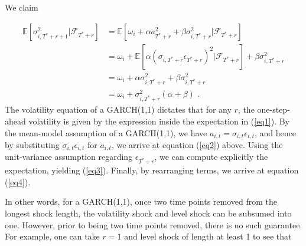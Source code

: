 \documentclass[11pt]{article}
\theoremstyle{definition}
\newenvironment{proof-of-proposition}[1][{}]{\noindent{\bf
    Proof of Proposition {#1}}
  \hspace*{.5em}}{\qed\bigskip\\}
\begin{document}
\begin{proof-of-proposition}
We claim

\begin{align}
\mathbb{E}[ \sigma^{2}_{i,T^{*}+r+1} |\mathcal{F}_{T^{*}+r}] & = \mathbb{E}[\omega_{i} + \alpha a_{T^{*}+r}^{2} + \beta\sigma^{2}_{i,T^{*}+r} |\mathcal{F}_{T^{*}+r}] \label{eq1}\\
& = \omega_{i} + \mathbb{E}[\alpha(\sigma_{i,T^{*}+r}\epsilon_{T^{*}+r})^{2} |\mathcal{F}_{T^{*}+r}] + \beta\sigma^{2}_{i,T^{*}+r} \label{eq2}\\
& = \omega_{i} + \alpha\sigma_{i,T^{*}+r}^{2} + \beta\sigma^{2}_{i,T^{*}+r} \label{eq3}\\
& = \omega_{i} + \sigma^{2}_{i,T^{*}+r}(\alpha + \beta) \label{eq4} \text{ .}
\end{align}
The volatility equation of a GARCH(1,1) dictates that for any $r$, the one-step-ahead volatility is given by the expression inside the expectation in (\ref{eq1}).  By the mean-model assumption of a GARCH(1,1), we have $a_{i,t} = \sigma_{i,t}\epsilon_{i,t}$, and hence by substituting $\sigma_{i,t}\epsilon_{i,t}$ for $a_{i,t}$, we arrive at equation (\ref{eq2}) above.  Using the unit-variance assumption regarding $\epsilon_{T^{*}+r}$, we can compute explicitly the expectation, yielding (\ref{eq3}).  Finally, by rearranging terms, we arrive at equation (\ref{eq4}).
\end{proof-of-proposition}
In other words, for a GARCH(1,1), once two time points removed from the longest shock length, the volatility shock and level shock can be subsumed into one.  However, prior to being two time points removed, there is no such guarantee.  For example, one can take $r = 1$ and level shock of length at least 1 to see that 
\end{document}
